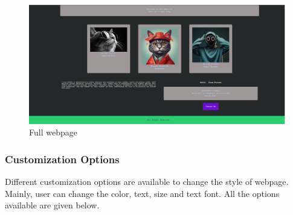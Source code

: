 \begin{figure}[H]
    \centering
           \includegraphics[scale=0.25,trim=230 10 190 10, clip]{images/full webpage.png}
           \caption{Full webpage}
           \label{fig:fullweb}
       \end{figure}


\subsubsection{Customization Options}
Different customization options are available to change the style of webpage. Mainly, user can change the color, text,  
size and text font.  All the options available are given below.

